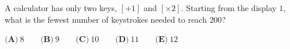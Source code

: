 A calculator has only two keys, $[+1]$ and $[\times2]$. Starting from the display $1$, what is the fewest number of keystrokes needed to reach $200$?

$\textbf{(A)}\ 8\qquad\textbf{(B)}\ 9\qquad\textbf{(C)}\ 10\qquad\textbf{(D)}\ 11\qquad\textbf{(E)}\ 12$
